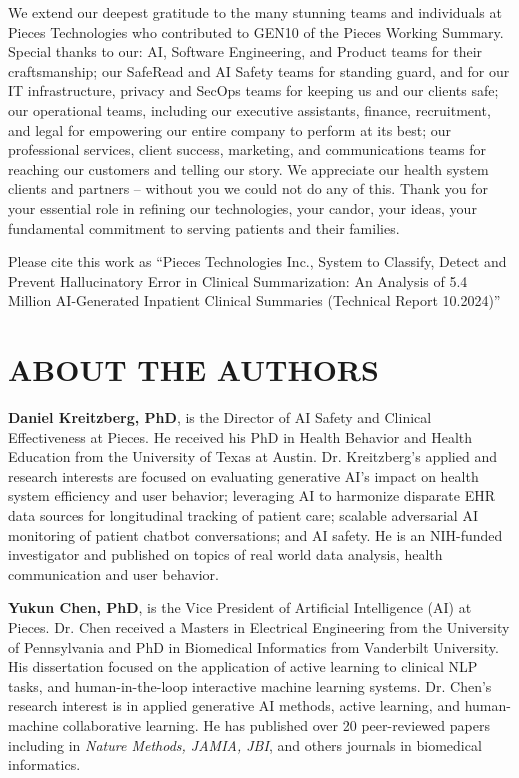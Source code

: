 \documentclass{style/myclass}
\begin{document}
We extend our deepest gratitude to the many stunning teams and individuals at Pieces Technologies who contributed to GEN10 of the Pieces Working Summary. Special thanks to our: AI, Software Engineering, and Product teams for their craftsmanship; our SafeRead and AI Safety teams for standing guard, and for our IT infrastructure, privacy and SecOps teams for keeping us and our clients safe; our operational teams, including our executive assistants, finance, recruitment, and legal for empowering our entire company to perform at its best; our professional services, client success, marketing, and communications teams for reaching our customers and telling our story. We appreciate our health system clients and partners – without you we could not do any of this. Thank you for your essential role in refining our technologies, your candor, your ideas, your fundamental commitment to serving patients and their families.

Please cite this work as “Pieces Technologies Inc., System to Classify, Detect and Prevent Hallucinatory Error in Clinical Summarization: An Analysis of 5.4 Million AI-Generated Inpatient Clinical Summaries (Technical Report 10.2024)”

\section*{ABOUT THE AUTHORS}

\textbf{Daniel Kreitzberg, PhD}, is the Director of AI Safety and Clinical Effectiveness at Pieces. He received his PhD in Health Behavior and Health Education from the University of Texas at Austin. Dr. Kreitzberg’s applied and research interests are focused on evaluating generative AI's impact on health system efficiency and user behavior; leveraging AI to harmonize disparate EHR data sources for longitudinal tracking of patient care; scalable adversarial AI monitoring of patient chatbot conversations; and AI safety. He is an NIH-funded investigator and published on topics of real world data analysis, health communication and user behavior.

\textbf{Yukun Chen, PhD}, is the Vice President of Artificial Intelligence (AI) at Pieces. Dr. Chen received a Masters in Electrical Engineering from the University of Pennsylvania and PhD in Biomedical Informatics from Vanderbilt University. His dissertation focused on the application of active learning to clinical NLP tasks, and human-in-the-loop interactive machine learning systems. Dr. Chen’s research interest is in applied generative AI methods, active learning, and human-machine collaborative learning. He has published over 20 peer-reviewed papers including in \textit{Nature Methods, JAMIA, JBI}, and others journals in biomedical informatics.
\end{document}
